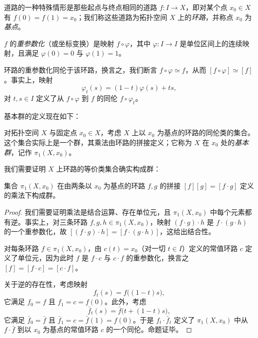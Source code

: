 道路的一种特殊情形是那些起点与终点相同的道路 $f\colon I\to X$，即对某个点 $x_0\in X$ 有 $f(0)=f(1)=x_0$；我们称这些道路为拓扑空间 $X$ 上的\emph{环路}，并称点 $x_0$ 为\emph{基点}。

$f$ 的\emph{重参数化}（或坐标变换）是映射 $f\circ\varphi$，其中 $\varphi\colon I\to I$ 是单位区间上的连续映射，且满足 $\varphi(0)=0$ 与 $\varphi(1)=1$。

环路的重参数化同伦于该环路，换言之，我们断言 $f\circ\varphi\simeq f$，从而 $[f\circ\varphi]\simeq[f]$。事实上，映射
\[
\varphi_t(s)=(1-t)\varphi(s)+ts,
\]
对 $t,s\in I$ 定义了从 $f\circ\varphi$ 到 $f$ 的同伦 $f\circ\varphi_t$。

基本群的定义现在如下：

\begin{definition}[1.11]
对拓扑空间 $X$ 与固定点 $x_0\in X$，考虑 $X$ 上以 $x_0$ 为基点的环路的同伦类的集合。这个集合实际上是一个群，其乘法由环路的拼接定义；它称为 $X$ 在 $x_0$ 处的\emph{基本群}，记作 $\pi_1(X,x_0)$。
\end{definition}

我们需要证明 $X$ 上环路的等价类集合确实构成群：

\begin{proposition}[1.12]
集合 $\pi_1(X,x_0)$ 在由两条以 $x_0$ 为基点的环路 $f,g$ 的拼接 $[f][g]=[f\cdot g]$ 定义的乘法下构成群。
\end{proposition}

\begin{proof}
我们需要证明乘法是结合运算、存在单位元，且 $\pi_1(X,x_0)$ 中每个元素都有逆。事实上，对三条环路 $f,g,h\in\pi_1(X,x_0)$，映射 $(f\cdot g)\cdot h$ 是 $f\cdot(g\cdot h)$ 的一个重参数化，故 $[(f\cdot g)\cdot h]=[f\cdot(g\cdot h)]$，这给出结合性。

对每条环路 $f\in\pi_1(X,x_0)$，由 $c(t)=x_0$（对一切 $t\in I$）定义的常值环路 $c$ 定义了单位元，因为此时 $f$ 是 $f\cdot c$ 与 $c\cdot f$ 的重参数化，换言之 $[f]=[f\cdot c]=[c\cdot f]$。

关于逆的存在性，考虑映射
\[
f_t(s)=f\bigl((1-t)s\bigr),
\]
它满足 $f_0=f$ 且 $f_1=c=f(0)$。此外，考虑
\[
\bar f_t(s)=\bar f\bigl(t+(1-t)s\bigr),
\]
它满足 $\bar f_0=\bar f$ 且 $\bar f_1=c=\bar f(1)=f(0)$。于是 $f_t\cdot\bar f_t$ 定义了 $\pi_1(X,x_0)$ 中从 $f\cdot\bar f$ 到以 $x_0$ 为基点的常值环路 $c$ 的一个同伦。命题证毕。
\end{proof}


